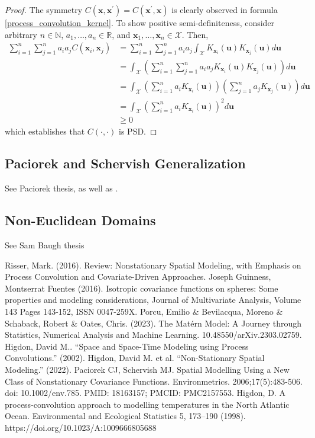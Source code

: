 \documentclass[12pt]{article}
\newcommand{\R}{\mathbb{R}}
\newcommand{\Ker}{K}
\newcommand{\covFun}{C}
\newcommand{\locSpace}{\mathcal{X}}
\newcommand{\loc}{\mathbf{x}}
\newcommand{\locTwo}{\loc^\prime}
\newcommand{\locDum}{\mathbf{u}}
\begin{document}
\begin{proof} 
The symmetry $\covFun(\loc, \locTwo) = \covFun(\locTwo, \loc)$ is clearly observed in formula \ref{process_convolution_kernel}. To show positive semi-definiteness, consider arbitrary 
$n \in \mathbb{N}$, $a_1, \dots, a_n \in \R$, and $\loc_1, \dots, \loc_n \in \locSpace$. Then, 
\begin{align*}
\sum_{i = 1}^{n} \sum_{j = 1}^{n} a_i a_j \covFun(\loc_i, \loc_j) 
&= \sum_{i = 1}^{n} \sum_{j = 1}^{n} a_i a_j \int_{\locSpace} \Ker_{\loc_i}(\locDum) \Ker_{\loc_j}(\locDum) d\locDum \\
&= \int_{\locSpace} \left(\sum_{i = 1}^{n} \sum_{j = 1}^{n} a_i a_j  \Ker_{\loc_i}(\locDum) \Ker_{\loc_j}(\locDum)\right) d\locDum \\
&=  \int_{\locSpace} \left(\sum_{i = 1}^{n} a_i \Ker_{\loc_i}(\locDum)\right)  \left(\sum_{j = 1}^{n} a_j \Ker_{\loc_j}(\locDum)\right) d\locDum \\
&=  \int_{\locSpace} \left(\sum_{i = 1}^{n} a_i \Ker_{\loc_i}(\locDum)\right)^2 d\locDum \\
&\geq 0
\end{align*}
which establishes that $\covFun(\cdot, \cdot)$ is PSD. 
\end{proof} 

\subsection{Paciorek and Schervish Generalization}
See Paciorek thesis, as well as \cite{Paciorek}. 

\subsection{Non-Euclidean Domains}
See Sam Baugh thesis


\begin{thebibliography}{20}
 Risser, Mark. (2016). Review: Nonstationary Spatial Modeling, with Emphasis on Process Convolution and Covariate-Driven Approaches. 
 Joseph Guinness, Montserrat Fuentes (2016). Isotropic covariance functions on spheres: Some properties and modeling considerations, Journal of Multivariate Analysis, Volume 143
Pages 143-152, ISSN 0047-259X.
 Porcu, Emilio \& Bevilacqua, Moreno \& Schaback, Robert \& Oates, Chris. (2023). The Mat\'ern Model: A Journey through Statistics, Numerical Analysis and Machine Learning. 10.48550/arXiv.2303.02759. 
 Higdon, David M.. “Space and Space-Time Modeling using Process Convolutions.” (2002).
 Higdon, David M. et al. “Non-Stationary Spatial Modeling.” (2022).
 Paciorek CJ, Schervish MJ. Spatial Modelling Using a New Class of Nonstationary Covariance Functions. Environmetrics. 2006;17(5):483-506. doi: 10.1002/env.785. PMID: 18163157; PMCID: PMC2157553.
 Higdon, D. A process-convolution approach to modelling temperatures in the North Atlantic Ocean. Environmental and Ecological Statistics 5, 173–190 (1998). https://doi.org/10.1023/A:1009666805688
\end{thebibliography}
\end{document}
